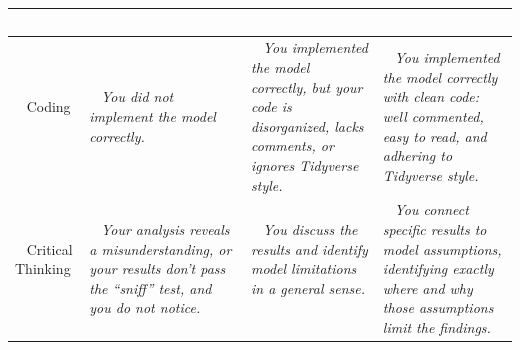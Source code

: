 \documentclass{article}
\begin{document}
\begin{tabular}{|>{\centering\arraybackslash}p{2.5cm}|>{\centering\arraybackslash}p{5cm}|>{\centering\arraybackslash}p{5cm}|>{\centering\arraybackslash}p{5cm}|}
            \newline ~\\
          \hline
          ~ \newline
          Coding
            \newline ~ & ~ \newline
            \it You did not implement the model correctly.
            \newline ~ & ~ \newline
            \it You implemented the model correctly, but your code is disorganized, lacks comments, or ignores Tidyverse style.
            \newline ~ & ~ \newline
            \it You implemented the model correctly with clean code: well commented, easy to read, and adhering to Tidyverse style.
            \newline ~\\
          \hline
          ~ \newline
          Critical \newline Thinking
            \newline ~ & ~ \newline
            \it Your analysis reveals a misunderstanding, or your results don't pass the ``sniff'' test, and you do not notice.
            \newline ~ & ~ \newline
            \it You discuss the results and identify model limitations in a general sense.
            \newline ~ & ~ \newline
            \it You connect specific results to model assumptions, identifying exactly where and why those assumptions limit the findings.
            \newline ~\\
          \hline
        \end{tabular}
      \vspace{5mm}
\end{document}
